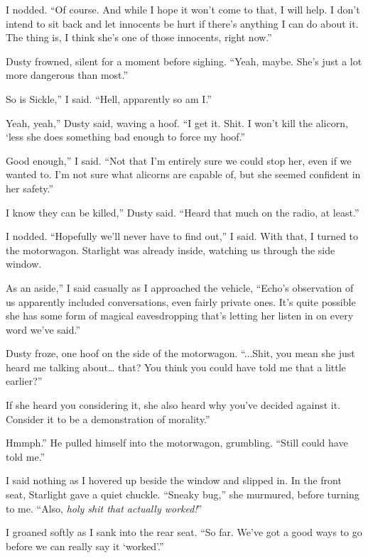 I nodded. “Of course. And while I hope it won’t come to that, I will help. I don’t intend to sit back and let innocents be hurt if there’s anything I can do about it. The thing is, I think she’s one of those innocents, right now.”

Dusty frowned, silent for a moment before sighing. “Yeah, maybe. She’s just a lot more dangerous than most.”

\leavevmode{}So is Sickle,” I said. “Hell, apparently so am I.”

\leavevmode{}Yeah, yeah,” Dusty said, waving a hoof. “I get it. Shit. I won’t kill the alicorn, ‘less she does something bad enough to force my hoof.”

\leavevmode{}Good enough,” I said. “Not that I’m entirely sure we could stop her, even if we wanted to. I’m not sure what alicorns are capable of, but she seemed confident in her safety.”

\leavevmode{}I know they can be killed,” Dusty said. “Heard that much on the radio, at least.”

I nodded. “Hopefully we’ll never have to find out,” I said. With that, I turned to the motorwagon. Starlight was already inside, watching us through the side window.

\leavevmode{}As an aside,” I said casually as I approached the vehicle, “Echo’s observation of us apparently included conversations, even fairly private ones. It’s quite possible she has some form of magical eavesdropping that’s letting her listen in on every word we’ve said.”

Dusty froze, one hoof on the side of the motorwagon. “...Shit, you mean she just heard me talking about… that? You think you could have told me that a little earlier?”

\leavevmode{}If she heard you considering it, she also heard why you’ve decided against it. Consider it to be a demonstration of morality.”

\leavevmode{}Hmmph.” He pulled himself into the motorwagon, grumbling. “Still could have told me.”

I said nothing as I hovered up beside the window and slipped in. In the front seat, Starlight gave a quiet chuckle. “Sneaky bug,” she murmured, before turning to me. “Also, \textit{holy shit that actually worked!}”

I groaned softly as I sank into the rear seat. “So far. We’ve got a good ways to go before we can really say it ‘worked’.”

